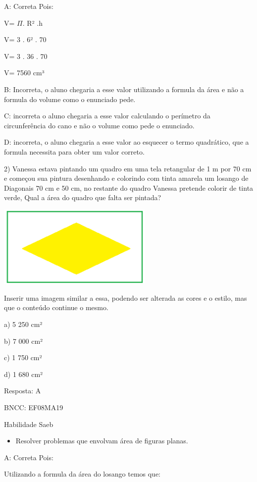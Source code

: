 A: Correta Pois:

V= \(\Pi\). R² .h

V= 3 . 6² . 70

V= 3 . 36 . 70

V= 7560 cm³

B: Incorreta, o aluno chegaria a esse valor utilizando a formula da área
e não a formula do volume como o enunciado pede.

C: incorreta o aluno chegaria a esse valor calculando o perímetro da
circunferência do cano e não o volume como pede o enunciado.

D: incorreta, o aluno chegaria a esse valor ao esquecer o termo
quadrático, que a formula necessita para obter um valor correto.

2) Vanessa estava pintando um quadro em uma tela retangular de 1 m por
70 cm e começou sua pintura desenhando e colorindo com tinta amarela um
losango de Diagonais 70 cm e 50 cm, no restante do quadro Vanessa
pretende colorir de tinta verde, Qual a área do quadro que falta ser
pintada?

\includegraphics[width=2.95833in,height=1.56526in]{./imgSAEB_8_MAT/media/image54.png}

Inserir uma imagem similar a essa, podendo ser alterada as cores e o
estilo, mas que o conteúdo continue o mesmo.

a) 5 250 cm²

b) 7 000 cm²

c) 1 750 cm²

d) 1 680 cm²

Resposta: A

BNCC: EF08MA19

Habilidade Saeb

\begin{itemize}
\tightlist
\item
  Resolver problemas que envolvam área de figuras planas.
\end{itemize}

A: Correta Pois:

Utilizando a formula da área do losango temos que:

